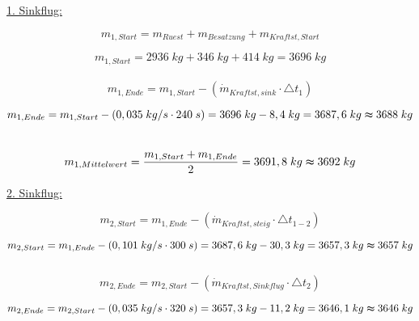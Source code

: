\underline{1. Sinkflug:}

\begin{equation*}
m_{1,Start} = m_{Ruest} + m_{Besatzung} + m_{Kraftst,Start}
\end{equation*}

\begin{equation*}
m_{1,Start} = 2936 \; {kg} + 346 \; {kg} +414 \; {kg} = 3696 \; {kg}
\end{equation*}
\\

\begin{equation*}
m_{1,Ende} = m_{1,Start} - (\dot{m}_{Kraftst,sink} \cdot \triangle t_1)
\end{equation*}

\begin{equation*}
m_{1,Ende} = m_{1,Start} - (0,035 \; {kg/s} \cdot 240 \; {s}) = 3696 \; {kg} - 8,4 \; {kg} = 3687,6 \; {kg} \thickapprox 3688 \; {kg}
\end{equation*} \\

\begin{equation*}
m_{1,Mittelwert} = \frac{m_{1,Start} + m_{1,Ende}}{2} = 3691,8 \; {kg} \thickapprox 3692 \; {kg}
\end{equation*}

\vspace{5mm}
\underline{2. Sinkflug:}

\begin{equation*}
m_{2,Start} = m_{1,Ende} - (\dot{m}_{Kraftst,steig} \cdot \triangle t_{1-2})
\end{equation*}

\begin{equation*}
m_{2,Start} = m_{1,Ende} - (0,101 \; {kg/s} \cdot 300 \; {s}) = 3687,6 \; {kg} - 30,3 \; {kg} = 3657,3 \; {kg} \thickapprox 3657 \; {kg}
\end{equation*} \\

\begin{equation*}
m_{2,Ende} = m_{2,Start} - (\dot{m}_{Kraftst,Sinkflug} \cdot \triangle t_2)
\end{equation*}

\begin{equation*}
m_{2,Ende} = m_{2,Start} - (0,035 \; {kg/s} \cdot 320 \; {s}) = 3657,3 \; {kg} - 11,2 \; {kg} = 3646,1 \; {kg} \thickapprox 3646 \; {kg}
\end{equation*} \\

